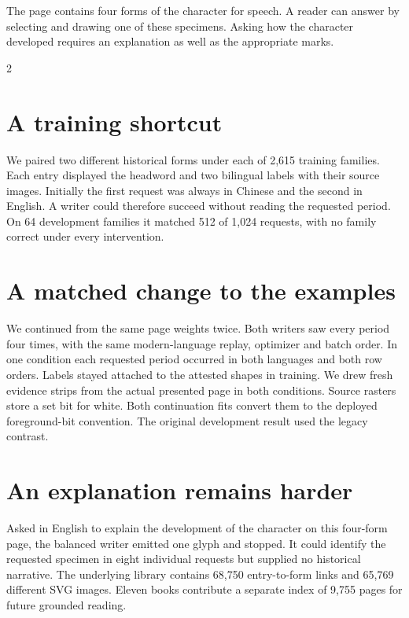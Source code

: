 \newpage
{}
\noindent The page contains four forms of the character for speech. A reader can answer by selecting and drawing one of these specimens. Asking how the character developed requires an explanation as well as the appropriate marks.
\begin{multicols}{2}
\section*{A training shortcut}
We paired two different historical forms under each of 2,615 training families. Each entry displayed the headword and two bilingual labels with their source images. Initially the first request was always in Chinese and the second in English. A writer could therefore succeed without reading the requested period. On 64 development families it matched 512 of 1,024 requests, with no family correct under every intervention.
\section*{A matched change to the examples}
We continued from the same page weights twice. Both writers saw every period four times, with the same modern-language replay, optimizer and batch order. In one condition each requested period occurred in both languages and both row orders. Labels stayed attached to the attested shapes in training. We drew fresh evidence strips from the actual presented page in both conditions. Source rasters store a set bit for white. Both continuation fits convert them to the deployed foreground-bit convention. The original development result used the legacy contrast.
\section*{An explanation remains harder}
Asked in English to explain the development of the character on this four-form page, the balanced writer emitted one glyph and stopped. It could identify the requested specimen in eight individual requests but supplied no historical narrative. The underlying library contains 68,750 entry-to-form links and 65,769 different SVG images. Eleven books contribute a separate index of 9,755 pages for future grounded reading.
\end{multicols}
